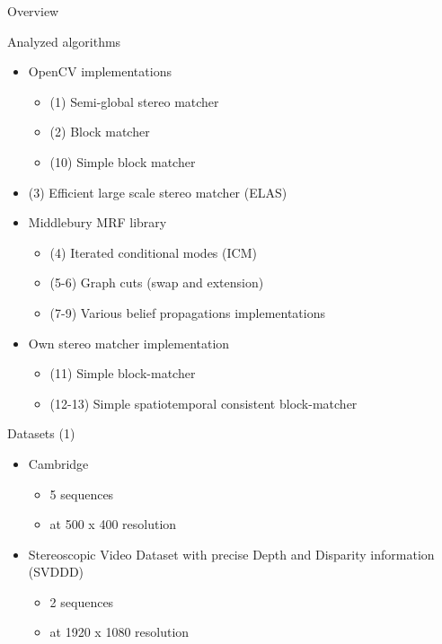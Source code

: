 \documentclass[10pt]{beamer}
\begin{document}
\begin{frame}[fragile]{Overview}
  \begin{block}{Analyzed algorithms}
    \begin{itemize}
      \item OpenCV implementations
      \begin{itemize}
        \item (1) Semi-global stereo matcher
        \item (2) Block matcher
        \item (10) Simple block matcher
      \end{itemize}
      \item (3) Efficient large scale stereo matcher (ELAS)
      \item Middlebury MRF library
      \begin{itemize}
        \item (4) Iterated conditional modes (ICM)
        \item (5-6) Graph cuts (swap and extension)
        \item (7-9) Various belief propagations implementations
      \end{itemize}
      \item Own stereo matcher implementation
      \begin{itemize}
        \item (11) Simple block-matcher
        \item (12-13) Simple spatiotemporal consistent block-matcher
      \end{itemize}
    \end{itemize}
  \end{block}
\end{frame}

\begin{frame}[fragile]{Datasets (1)}
  \begin{itemize}
    \item Cambridge
    \begin{itemize}
      \item 5 sequences
      \item at 500 x 400 resolution
    \end{itemize}
    \item Stereoscopic Video Dataset with precise Depth and Disparity information (SVDDD)
    \begin{itemize}
      \item 2 sequences
      \item at 1920 x 1080 resolution
    \end{itemize}
  \end{itemize}
\end{frame}
\end{document}
